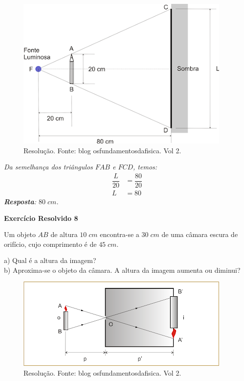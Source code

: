 \documentclass[11pt,twocolumn,oneside]{article}
\newenvironment{resposta*}
  {\bf Resposta:\\ }
  {}
\begin{document}
\begin{figure}[h]{}
\centering\includegraphics[width=2.5truein]{imgexe1.png}
\caption{Resolução. Fonte: blog osfundamentosdafisica. Vol 2.}
\centering
\end{figure}

\begin{resposta*}
{\it Da semelhança dos triângulos $FAB$ e $FCD$, temos:
\begin{align*}
    \dfrac{L}{20} &= \dfrac{80}{20} \\
    L &= 80
\end{align*}
\textbf{Resposta}: $80\;cm$.}
\end{resposta*}

\textbf{Exercício Resolvido 8}


Um objeto $AB$ de altura $10\;cm$ encontra-se a $30\;cm$ de uma câmara escura de orifício, cujo comprimento é de $45\;cm$.


a) Qual é a altura da imagem? \\
b) Aproxima-se o objeto da câmara. A altura da imagem aumenta ou diminui?


\begin{figure}[h]{}
\centering\includegraphics[width=2.5truein]{imgexe2.png}
\caption{Resolução. Fonte: blog osfundamentosdafisica. Vol 2.}
\centering
\end{figure}
\end{document}
